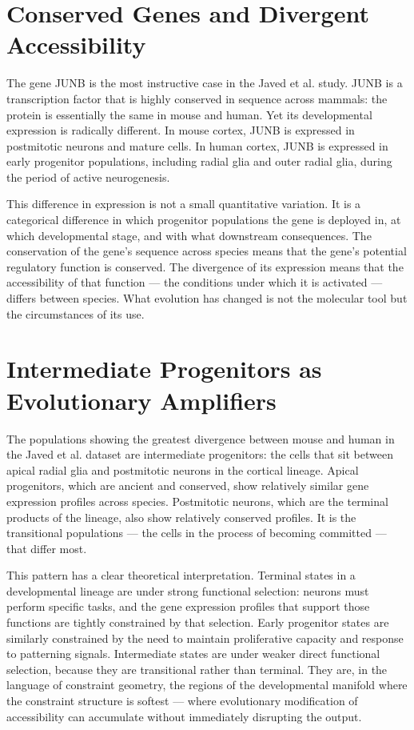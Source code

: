 \documentclass[12pt, a4paper, openany]{book}
\theoremstyle{definition}
\theoremstyle{remark}
\begin{document}
\section{Conserved Genes and Divergent Accessibility}

The gene JUNB is the most instructive case in the Javed et al. study. JUNB is a transcription factor that is highly conserved in sequence across mammals: the protein is essentially the same in mouse and human. Yet its developmental expression is radically different. In mouse cortex, JUNB is expressed in postmitotic neurons and mature cells. In human cortex, JUNB is expressed in early progenitor populations, including radial glia and outer radial glia, during the period of active neurogenesis.

This difference in expression is not a small quantitative variation. It is a categorical difference in which progenitor populations the gene is deployed in, at which developmental stage, and with what downstream consequences. The conservation of the gene's sequence across species means that the gene's potential regulatory function is conserved. The divergence of its expression means that the accessibility of that function — the conditions under which it is activated — differs between species. What evolution has changed is not the molecular tool but the circumstances of its use.

\section{Intermediate Progenitors as Evolutionary Amplifiers}

The populations showing the greatest divergence between mouse and human in the Javed et al. dataset are intermediate progenitors: the cells that sit between apical radial glia and postmitotic neurons in the cortical lineage. Apical progenitors, which are ancient and conserved, show relatively similar gene expression profiles across species. Postmitotic neurons, which are the terminal products of the lineage, also show relatively conserved profiles. It is the transitional populations — the cells in the process of becoming committed — that differ most.

This pattern has a clear theoretical interpretation. Terminal states in a developmental lineage are under strong functional selection: neurons must perform specific tasks, and the gene expression profiles that support those functions are tightly constrained by that selection. Early progenitor states are similarly constrained by the need to maintain proliferative capacity and response to patterning signals. Intermediate states are under weaker direct functional selection, because they are transitional rather than terminal. They are, in the language of constraint geometry, the regions of the developmental manifold where the constraint structure is softest — where evolutionary modification of accessibility can accumulate without immediately disrupting the output.
\end{document}
